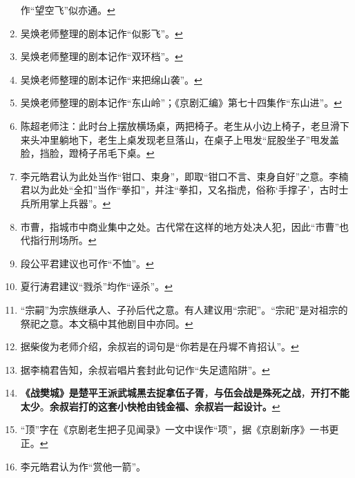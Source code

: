 \begin{enumerate}
  \leavevmode\hypertarget{fn44}{}%
  作``望空飞''似亦通。\protect\hyperlink{fnref44}{↩}
\item
  \leavevmode\hypertarget{fn45}{}%
  吴焕老师整理的剧本记作``似影飞''。\protect\hyperlink{fnref45}{↩}
\item
  \leavevmode\hypertarget{fn46}{}%
  吴焕老师整理的剧本记作``双环档''。\protect\hyperlink{fnref46}{↩}
\item
  \leavevmode\hypertarget{fn47}{}%
  吴焕老师整理的剧本记作``来把绵山袭''。\protect\hyperlink{fnref47}{↩}
\item
  \leavevmode\hypertarget{fn48}{}%
  吴焕老师整理的剧本记作``东山岭''；《京剧汇编》第七十四集作``东山进''。\protect\hyperlink{fnref48}{↩}
\item
  \leavevmode\hypertarget{fn49}{}%
  陈超老师注：此时台上摆放横场桌，两把椅子。老生从小边上椅子，老旦滑下来头冲里躺地下，老生上桌发现老旦落山，在桌子上甩发``屁股坐子''甩发盖脸，挡脸，蹬椅子吊毛下桌。\protect\hyperlink{fnref49}{↩}
\item
  \leavevmode\hypertarget{fn50}{}%
  李元皓君认为此处当作``钳口、束身''，即取``钳口不言、束身自好''之意。李楠君以为此处``全扣''当作``拳扣''，并注``拳扣，又名指虎，俗称`手撑子'，古时士兵所用掌上兵器''。\protect\hyperlink{fnref50}{↩}
\item
  \leavevmode\hypertarget{fn51}{}%
  市曹，指城市中商业集中之处。古代常在这样的地方处决人犯，因此``市曹''也代指行刑场所。\protect\hyperlink{fnref51}{↩}
\item
  \leavevmode\hypertarget{fn52}{}%
  段公平君建议也可作``不恤''。\protect\hyperlink{fnref52}{↩}
\item
  \leavevmode\hypertarget{fn53}{}%
  夏行涛君建议``戮杀''均作``诬杀''。\protect\hyperlink{fnref53}{↩}
\item
  \leavevmode\hypertarget{fn54}{}%
  ``宗嗣''为宗族继承人、子孙后代之意。有人建议用``宗祀''。``宗祀''是对祖宗的祭祀之意。本文稿中其他剧目中亦同。\protect\hyperlink{fnref54}{↩}
\item
  \leavevmode\hypertarget{fn55}{}%
  据柴俊为老师介绍，余叔岩的词句是``你若是在丹墀不肯招认''。\protect\hyperlink{fnref55}{↩}
\item
  \leavevmode\hypertarget{fn56}{}%
  据李楠君告知，余叔岩唱片套封此句记作``失足遗陷阱''。\protect\hyperlink{fnref56}{↩}
\item
  \leavevmode\hypertarget{fn57}{}%
  \textbf{《战樊城》是楚平王派武城黑去捉拿伍子胥}，\textbf{与伍会战是殊死之战}，\textbf{开打不能太少}。\textbf{余叔岩打的这套小快枪由钱金福、余叔岩一起设计。}\protect\hyperlink{fnref57}{↩}
\item
  \leavevmode\hypertarget{fn58}{}%
  ``顶''字在《京剧老生把子见闻录》一文中误作``项''，据《京剧新序》一书更正。\protect\hyperlink{fnref58}{↩}
\item
  \leavevmode\hypertarget{fn59}{}%
  李元皓君认为作``赏他一箭''。


\end{enumerate}
